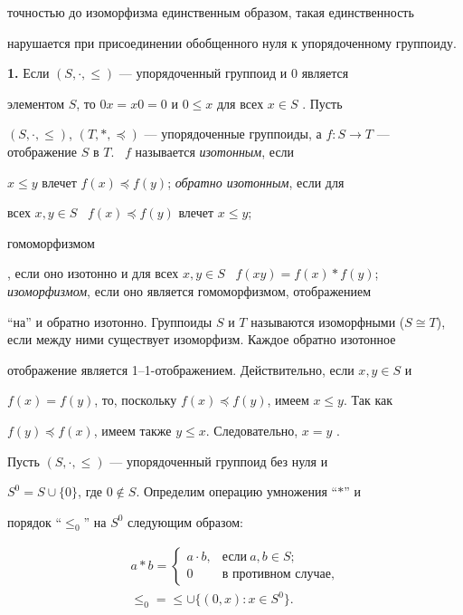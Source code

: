 точностью до изоморфизма единственным образом, такая единственность 


нарушается при присоединении обобщенного нуля к упорядоченному группоиду. 


\medskip 


 


{\bf 1.} Если $(S,\cdot,\le)$ --- упорядоченный группоид и 0 является 


элементом $S$, то $0x=x0=0$ и $0\le x$ для всех $x\in S$ \cite{1}. Пусть 


$(S,\cdot,\le)$, $(T,*,\preceq)$ --- упорядоченные группоиды, а $f:S\to 


T$ --- отображение $S$ в $T$. \ $f$ называется {\it изотонным}, если 


$x\le y$ влечет $f(x)\preceq f(y)$; {\it обратно изотонным}, если для 


всех $x,y\in S$ \ $f(x)\preceq f(y)$ влечет $x\le y$; {\it 


гомоморфизмом}, если оно изотонно и для всех $x,y\in S$ \ $f(xy)=f(x)* 


f(y)$; {\it изоморфизмом}, если оно является гомоморфизмом, отображением 


``на'' и обратно изотонно. Группоиды $S$ и $T$ называются изоморфными ($S\cong 


T$), если между ними существует изоморфизм. Каждое обратно изотонное 


отображение является 1--1-отображением. Действительно, если $x,y\in S$ и 


$f(x)=f(y)$, то, поскольку $f(x)\preceq f(y)$, имеем $x\le y$. Так как 


$f(y)\preceq f(x)$, имеем также $y\le x$. Следовательно, $x=y$ \cite{2}. 


 


Пусть $(S,\cdot,\le)$ --- упорядоченный группоид без нуля и 


$S^0=S\cup\{0\}$, где $0\notin S$. Определим операцию умножения ``$*$'' и 


порядок ``$\le_0$'' на $S^0$ следующим образом: 


\begin{gather*} 


a* b=\begin{cases} 


a\cdot b, &\text{если} \ a,b\in S; \\ 


0 &\text{в противном случае}, 


\end{cases} 


\\ 


\le_0=\le\cup\{(0,x):x\in S^0\}. 


\end{gather*} 


